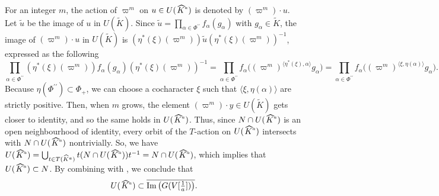 \documentclass[a4paper,11pt,reqno]{amsart}
\newcommand{\wt}{\widetilde}
\newcommand{\wh}{\widehat}
\newcommand{\prpr}{^{\prime\prime}}
\newcommand{\ov}{\overline}
\newcommand{\hka}{\!\stackon[-8pt]{\;$K^{\raisebox{1pt}{$\mathsmaller{\mathsmaller{a}}$}}$}{\vstretch{1.5}{\hstretch{1.7}{\widehat{\phantom{}}}}}}
\newcommand{\via}{V{[\f{1}{a}]}}
\newcommand{\nhka}{\wh{K}^a}
\providecommand{\p}[1]{\left(#1\right)}
\providecommand{\f}[2]{\frac{#1}{#2}}
\newcommand{\tst}{\textstyle}
\theoremstyle{plain}
\theoremstyle{remark}
\theoremstyle{definition}
\theoremstyle{plain}
\theoremstyle{definition}
\theoremstyle{subsection-tweak}
\theoremstyle{subsection-tweak}
\numberwithin{equation}{subsection}
\begin{document}
For an integer $m$, the action of $\varpi^{m}$ on $u\in U(\hka)$ is denoted by $(\varpi^m)\cdot u$.
Let $\wt{u}$ be the image of $u$ in $U(\wt{K})$.
Since $\wt{u}=\prod_{\alpha\in \Phi\prpr}f_{\alpha}({g}_{\alpha})$ with ${g}_{\alpha}\in \wt{K}$,  the image  of $(\varpi^m)\cdot u$ in $U(\wt{K})$ is $\p{\eta^{\ast}(\xi)(\varpi^m)} \wt{u} \p{\eta^{\ast}(\xi)(\varpi^m)}^{-1}$, expressed as the following
\[
\tst  \prod_{\alpha\in \Phi\prpr}\p{\eta^{\ast}(\xi)(\varpi^m)}f_{\alpha}(g_{\alpha})\p{\eta^{\ast}(\xi)(\varpi^m)}^{-1}=\prod_{\alpha\in \Phi\prpr}f_{\alpha}\bigl((\varpi^m)^{\langle \eta^{\ast}(\xi),\alpha\rangle}g_{\alpha}\bigr)=\prod_{\alpha\in \Phi\prpr}f_{\alpha}\bigl((\varpi^m)^{\langle \xi,\eta(\alpha)\rangle}g_{\alpha}\bigr). 
\]
Because $\eta(\Phi\prpr)\subset \Phi_{+}$, we can choose a cocharacter $\xi$ such that $\langle \xi, \eta(\alpha)\rangle$ are strictly positive. 
Then, when $m$ grows, the element $(\varpi^m)\cdot y\in U(\wt{K})$ gets closer to identity, and so the same holds in $U(\hka)$.
Thus, since $N\cap U(\hka)$ is an open neighbourhood of identity, every orbit of the $T$-action on $U(\hka)$ intersects with $N\cap U(\hka)$ nontrivially.
So, we have $U(\hka)=\bigcup_{t\in T(\nhka)}t(N\cap U(\hka))t^{-1}=N\cap U(\hka)$,
which implies that $U(\hka)\subset N$.
By combining with , we conclude that 
\begin{equation}\label{uni-in}
\tst U(\hka)\subset \ov{\mathrm{Im}\p{G(\via)}}.
\end{equation}
   
\end{document}
